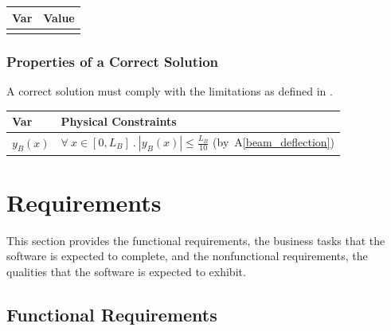 \documentclass[12pt]{article}
\newcommand{\aref}[1]{A\ref{#1}}
\begin{document}
\begin{table}[!h]
    \caption{Specification Parameter Values} \label{TblSpecParams}
    \renewcommand{\arraystretch}{1.2}
    \noindent \begin{longtable*}{l l}
        \toprule
        \textbf{Var} & \textbf{Value} \\
        \midrule
        \textemdash{} & \textemdash{} \\
        \bottomrule
    \end{longtable*}
\end{table}

\subsubsection{Properties of a Correct Solution}
\label{sec_CorrectSolution}

\noindent{}A correct solution must comply with the limitations as defined in
.

\begin{table}[!h]
    \caption{Output Variables}
    \label{TblOutputVar}
    \renewcommand{\arraystretch}{1.2}
    \noindent \begin{longtable*}{l l}
        \toprule
        \textbf{Var} & \textbf{Physical Constraints} \\
        \midrule
        $y_{B}(x)$ & $\forall~x \in [0, L_B]~.~|y_{B}(x)| \leq \frac{L_B}{10}$ (by~\aref{beam_deflection})
        \\
        \bottomrule
    \end{longtable*}
\end{table}



\section{Requirements}

This section provides the functional requirements, the business tasks that the
software is expected to complete, and the nonfunctional requirements, the
qualities that the software is expected to exhibit.

\subsection{Functional Requirements}
\end{document}
